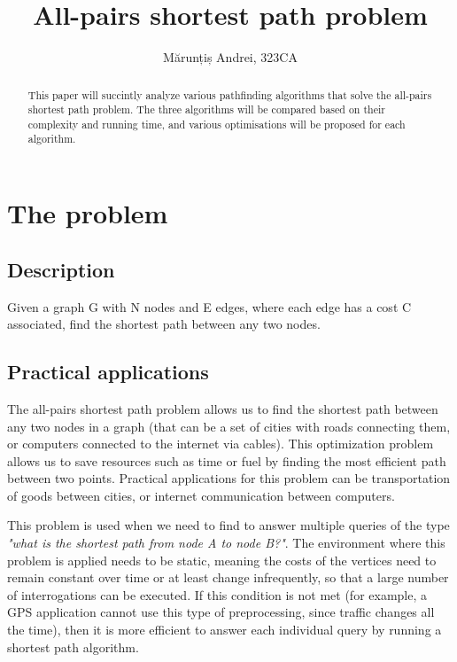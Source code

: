 \documentclass[runningheads]{llncs}
\begin{document}
%
\title{All-pairs shortest path problem}
%
%
\author{Mărunțiș Andrei, 323CA}
%
\maketitle              %
%
\begin{abstract}
This paper will succintly analyze various pathfinding algorithms that solve the all-pairs shortest path problem. The three algorithms will be compared based on their complexity and running time, and various optimisations will be proposed for each algorithm.

\end{abstract}
%
%
%
\section{The problem}
\subsection{Description}
Given a graph G with N nodes and E edges, where each edge has a cost C associated, find the shortest path between any two nodes.

\subsection{Practical applications}
The all-pairs shortest path problem allows us to find the shortest path between any two nodes in a graph (that can be a set of cities with roads connecting them, or computers connected to the internet via cables). This optimization problem allows us to save resources such as time or fuel by finding the most efficient path between two points. Practical applications for this problem can be transportation of goods between cities, or internet communication between computers.

This problem is used when we need to find to answer multiple queries of the type \textit{"what is the shortest path from node A to node B?"}. The environment where this problem is applied needs to be static, meaning the costs of the vertices need to remain constant over time or at least change infrequently, so that a large number of interrogations can be executed. If this condition is not met (for example, a GPS application cannot use this type of preprocessing, since traffic changes all the time), then it is more efficient to answer each individual query by running a shortest path algorithm.
\end{document}
